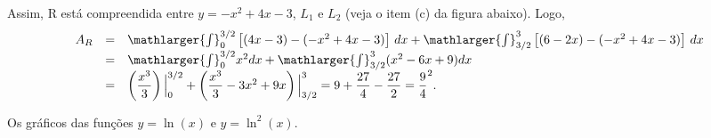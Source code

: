 \cleardoublepage\documentclass[../main.tex]{subfiles}
\begin{document}
\begin{exeresol}
\begin{compactenum}[a)]
\begin{solution}
Assim, R está compreendida entre \(y=-x^2 +4x-3\), $L_1$ e \(L_2\) (veja o item (c) da figura abaixo). Logo,
\[ \begin{array}{rcl} A_R&=& \mathlarger{\int}^{3/2}_{0} \left[ (4x-3)-(-x^2+4x-3) \right]\,dx + \mathlarger{\int}^{3}_{3/2} \left[ (6-2x)-(-x^2+4x-3) \right]\,dx\\ &= &\mathlarger{\int}^{3/2}_{0} x^2 dx + \mathlarger{\int}^{3}_{3/2} (x^2-6x +9)dx \\ &=& \left(\dfrac{x^3}{3}\right)\Big{|}^{3/2}_{0} + \left( \dfrac{x^3}{3} -3x^2 +9x \right)\Big{|}^{3}_{3/2} =9+ \dfrac{27}{4}-\dfrac{27}{2} = \dfrac{9}{4} ^2. \end{array} \]
\end{solution}
\begin{figure}[H]
\centering
{}
\qquad
{}
\end{figure}
\item Os gráficos das funções \(y=\ln (x)\) e \(y=\ln^2( x)\).


\end{compactenum}
\end{exeresol}
\end{document}
